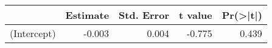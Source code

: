 
\begin{tabular}{l|r|r|r|r}
\hline
  & Estimate & Std. Error & t value & Pr(>|t|)\\
\hline
(Intercept) & -0.003 & 0.004 & -0.775 & 0.439\\
\hline
\end{tabular}
